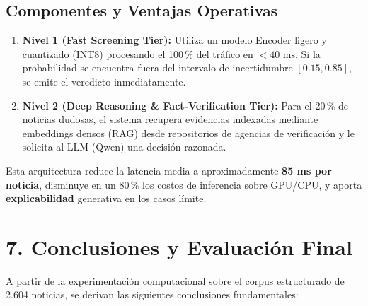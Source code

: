 \subsection*{Componentes y Ventajas Operativas}

\begin{enumerate}
    \item \textbf{Nivel 1 (Fast Screening Tier):} Utiliza un modelo Encoder ligero y cuantizado (INT8) procesando el 100\,\% del tráfico en $< 40\text{ ms}$. Si la probabilidad se encuentra fuera del intervalo de incertidumbre $[0.15, 0.85]$, se emite el veredicto inmediatamente.
    \item \textbf{Nivel 2 (Deep Reasoning \& Fact-Verification Tier):} Para el 20\,\% de noticias dudosas, el sistema recupera evidencias indexadas mediante embeddings densos (RAG) desde repositorios de agencias de verificación y le solicita al LLM (Qwen) una decisión razonada.
\end{enumerate}

Esta arquitectura reduce la latencia media a aproximadamente \textbf{85 ms por noticia}, disminuye en un 80\,\% los costos de inferencia sobre GPU/CPU, y aporta \textbf{explicabilidad} generativa en los casos límite.


\section*{7. Conclusiones y Evaluación Final}

A partir de la experimentación computacional sobre el corpus estructurado de 2.604 noticias, se derivan las siguientes conclusiones fundamentales:

